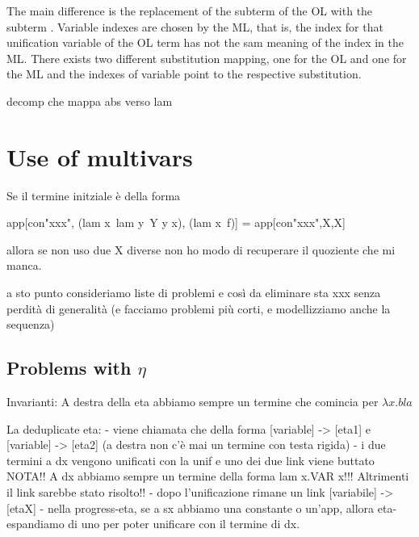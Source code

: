 \documentclass[sigconf,natbib=false,review]{acmart}
\begin{document}
\noindent
The main difference is the replacement of the subterm  of
the OL with the subterm . Variable indexes are chosen by the
ML, that is, the index  for that unification variable of the OL term
has not the sam meaning of the index  in the ML. There exists two
different substitution mapping, one for the OL and one for the ML and the indexes
of variable point to the respective substitution.

decomp che mappa abs verso lam
\noindent
{}

\section{Use of multivars}

Se il termine initziale è della forma

\begin{elpicode}
  app[con"xxx", (lam x\ lam y\ Y y x), (lam x\ f)]
  =
  app[con"xxx",X,X]
\end{elpicode}

allora se non uso due X diverse non ho modo di recuperare il quoziente che mi manca.

a sto punto consideriamo liste di problemi e così da eliminare sta xxx senza
perdità di generalità (e facciamo problemi più corti, e modellizziamo anche la
sequenza)

\subsection{Problems with $\eta$}




Invarianti:
A destra della eta abbiamo sempre un termine che comincia per $\lambda x. bla$

\begin{textcode}
  La deduplicate eta:
  - viene chiamata che della forma [variable] -> [eta1] e [variable] -> [eta2] 
    (a destra non c'è mai un termine con testa rigida)
  - i due termini a dx vengono unificati con la unif e uno dei due link viene buttato
    NOTA!! A dx abbiamo sempre un termine della forma lam x.VAR x!!!
    Altrimenti il link sarebbe stato risolto!!
  - dopo l'unificazione rimane un link [variabile] -> [etaX] 
  - nella progress-eta, se a sx abbiamo una constante o un'app, allora eta-espandiamo
    di uno per poter unificare con il termine di dx.
\end{textcode}
  
\end{document}
